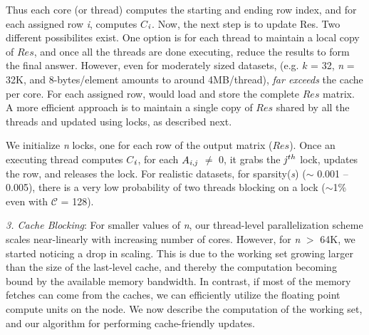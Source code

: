
     Thus each core (or thread) computes the starting and ending row
     index, and for each assigned row {\it{i}}, computes
     $C$$_{{\it{i}}}$. Now, the next step is to update Res.
     Two different possibilites exist. One option is for each thread
     to maintain a local copy of $Res$, and once all the threads are
     done executing, reduce the results to form the final answer.
     However, even for moderately sized datasets, (e.g. $k$ = 32,
     {\it{n}} = 32K, and 8-bytes/element amounts to around
     4MB/thread), 
     {\it{far exceeds}} the cache per core.
     For each assigned row,  would load and store the complete $Res$ matrix. 
     A more efficient approach is to maintain a
     single copy of $Res$ shared by all the threads and updated using
     locks, as described next.

     We initialize {\it{n}} locks, one for each row of the output
     matrix ($Res$).
     Once an executing thread computes $C$$_{{\it{i}}}$,
     for each  $A_{{\it{i}},{\it{j}}}$ $\neq$ 0, it grabs the
     ${\it{j}}^{th}$ lock, updates the row, and releases the lock. 
     For realistic datasets, for sparsity({\it{s}})
     ($\sim$
     0.001 -- 0.005), there is a very low probability of two threads
     blocking on a lock ($\sim$1\% even with ${\mathcal{C}}$ =
     128). 


     \vspace*{0.1in}
     {\it{3. Cache Blocking}}: For smaller values of {\it{n}}, our
     thread-level parallelization scheme scales near-linearly with
     increasing number of cores. However, for {\it{n}} $>$ 64K, we
     started noticing a drop in scaling. This is due to the working
     set growing larger than the size of the last-level cache, and
     thereby the computation becoming bound by the available memory
     bandwidth. In contrast, if most of the memory fetches can come
     from the caches, we can efficiently  utilize the floating
     point compute units on the node. We now
     describe the computation of the working set, and our algorithm
     for performing cache-friendly updates.

